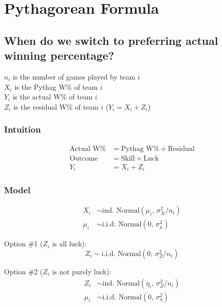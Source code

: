 \documentclass{article}
\begin{document}
  \section{\sc Pythagorean Formula}

    \subsection{\sc When do we switch to preferring actual winning percentage?}

      $n_i$ is the number of games played by team $i$\\
      $X_i$ is the Pythag W\% of team $i$\\
      $Y_i$ is the actual W\% of team $i$\\
      $Z_i$ is the residual W\% of team $i$ ($Y_i = X_i + Z_i$)

      \subsubsection*{\sc Intuition}

      \begin{align*}
        \mbox{Actual W\%} &= \mbox{Pythag W\%} + \mbox{Residual}\\
        \mbox{Outcome} &= \mbox{Skill} + \mbox{Luck}\\
        Y_i &= X_i + Z_i
      \end{align*}

      \subsubsection*{\sc Model}

      \begin{align*}
        X_i &\sim \mbox{ind. Normal}(\mu_i,\, \sigma^2_X / n_i)\\
        \mu_i &\sim \mbox{i.i.d. Normal}(0,\, \sigma^2_\mu)
      \end{align*}

      Option \#1 ($Z_i$ is all luck):
      \begin{equation*}
        Z_i \sim \mbox{i.i.d. Normal}(0,\, \sigma^2_Z / n_i)
      \end{equation*}

      Option \#2 ($Z_i$ is not purely luck):
      \begin{align*}
        Z_i &\sim \mbox{ind. Normal}(\eta_i,\, \sigma^2_Z / n_i)\\
        \mu_i &\sim \mbox{i.i.d. Normal}(0,\, \sigma^2_\eta)
      \end{align*}
\end{document}
